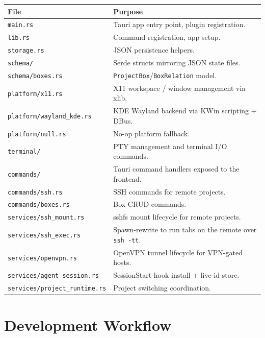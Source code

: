 \documentclass[11pt,a4paper]{article}
\newcommand{\code}[1]{\texttt{#1}}
\begin{document}
\begin{longtable}{@{}p{6.2cm}p{8.4cm}@{}}
\toprule
\textbf{File} & \textbf{Purpose} \\
\midrule
\endhead
\code{main.rs}                       & Tauri app entry point, plugin registration. \\
\code{lib.rs}                        & Command registration, app setup. \\
\code{storage.rs}                    & JSON persistence helpers. \\
\code{schema/}                       & Serde structs mirroring JSON state files. \\
\code{schema/boxes.rs}               & \code{ProjectBox}/\code{BoxRelation} model. \\
\code{platform/x11.rs}               & X11 workspace / window management via xlib. \\
\code{platform/wayland\_kde.rs}      & KDE Wayland backend via KWin scripting + DBus. \\
\code{platform/null.rs}              & No-op platform fallback. \\
\code{terminal/}                     & PTY management and terminal I/O commands. \\
\code{commands/}                     & Tauri command handlers exposed to the frontend. \\
\code{commands/ssh.rs}               & SSH commands for remote projects. \\
\code{commands/boxes.rs}             & Box CRUD commands. \\
\code{services/ssh\_mount.rs}        & sshfs mount lifecycle for remote projects. \\
\code{services/ssh\_exec.rs}         & Spawn-rewrite to run tabs on the remote over \code{ssh -tt}. \\
\code{services/openvpn.rs}           & OpenVPN tunnel lifecycle for VPN-gated hosts. \\
\code{services/agent\_session.rs}    & SessionStart hook install + live-id store. \\
\code{services/project\_runtime.rs}  & Project switching coordination. \\
\bottomrule
\end{longtable}

\section{Development Workflow}
\end{document}
